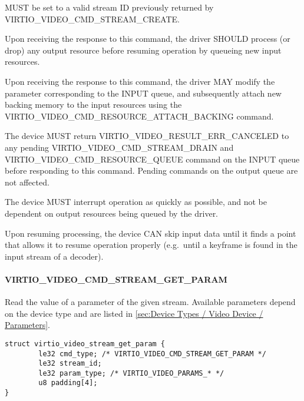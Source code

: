 
 MUST be set to a valid stream ID previously returned
by VIRTIO_VIDEO_CMD_STREAM_CREATE.

Upon receiving the response to this command, the driver SHOULD process
(or drop) any output resource before resuming operation by queueing new
input resources.

Upon receiving the response to this command, the driver MAY modify the
 parameter corresponding to
the INPUT queue, and subsequently attach new backing memory to the input
resources using the VIRTIO_VIDEO_CMD_RESOURCE_ATTACH_BACKING
command.


The device MUST return VIRTIO_VIDEO_RESULT_ERR_CANCELED to any
pending VIRTIO_VIDEO_CMD_STREAM_DRAIN and
VIRTIO_VIDEO_CMD_RESOURCE_QUEUE command on the INPUT queue before
responding to this command. Pending commands on the output queue are not
affected.

The device MUST interrupt operation as quickly as possible, and not be
dependent on output resources being queued by the driver.

Upon resuming processing, the device CAN skip input data until it finds
a point that allows it to resume operation properly (e.g.~until a
keyframe is found in the input stream of a decoder).

\paragraph{VIRTIO_VIDEO_CMD_STREAM_GET_PARAM}\label{sec:Device Types / Video Device / Device Operation / Device Operation: Stream commands / VIRTIO_VIDEO_CMD_STREAM_GET_PARAM}

Read the value of a parameter of the given stream. Available parameters
depend on the device type and are listed in
\ref{sec:Device Types / Video Device / Parameters}.

\begin{lstlisting}
struct virtio_video_stream_get_param {
        le32 cmd_type; /* VIRTIO_VIDEO_CMD_STREAM_GET_PARAM */
        le32 stream_id;
        le32 param_type; /* VIRTIO_VIDEO_PARAMS_* */
        u8 padding[4];
}
\end{lstlisting}

